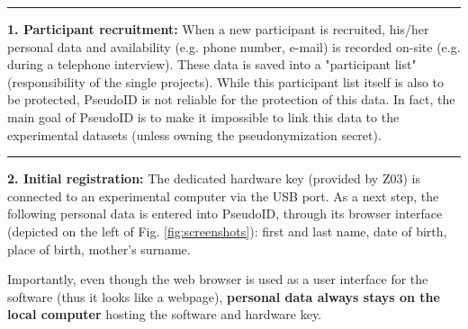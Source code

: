 \par\noindent\rule{\textwidth\color{pniblue}}{0.4pt}
\textbf{1. Participant recruitment:}
When a new participant is recruited, his/her personal data and availability (e.g. phone number, e-mail) is recorded on-site (e.g. during a telephone interview). These data is saved into a "participant list" (responsibility of the single projects). While this participant list itself is also to be protected, PseudoID is not reliable for the protection of this data. In fact, the main goal of PseudoID is to make it impossible to link this data to the experimental datasets (unless owning the pseudonymization secret).

\vspace{1}

\par\noindent\rule{\textwidth\color{pniblue}}{0.4pt}
\textbf{2. Initial registration:} The dedicated hardware key (provided by Z03) is connected to an experimental computer via the USB port. As a next step, the following personal data is entered into PseudoID, through its browser interface (depicted on the left of Fig. \ref{fig:screenshots}): first and last name, date of birth, place of birth, mother's surname.

Importantly, even though the web browser is used as a user interface for the software (thus it looks like a webpage), \textbf{personal data always stays on the local computer} hosting the software and hardware key.


